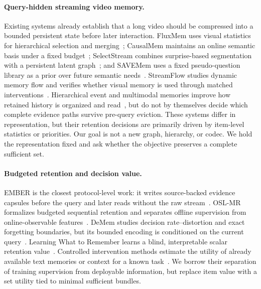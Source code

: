 \documentclass[10pt,twocolumn,letterpaper]{article}
\begin{document}
\paragraph{Query-hidden streaming video memory.}
Existing systems already establish that a long video should be compressed into a bounded persistent state before later interaction.
FluxMem uses visual statistics for hierarchical selection and merging~\cite{xie2026fluxmemadaptivehierarchicalmemory}; CausalMem maintains an online semantic basis under a fixed budget~\cite{song2026dynamicfixedbudgetmemorybank}; SelectStream combines surprise-based segmentation with a persistent latent graph~\cite{ge2026streamingvideomodelremember}; and SAVEMem uses a fixed pseudo-question library as a prior over future semantic needs~\cite{wu2026semanticawareadaptivevisualmemory}.
StreamFlow studies dynamic memory flow and verifies whether visual memory is used through matched interventions~\cite{fu2026streamflowdynamicmemoryflows}.
Hierarchical event and multimodal memories improve how retained history is organized and read~\cite{liang2026oasisondemandhierarchicalevent,yeo2026worldmmdynamicmultimodalmemory}, but do not by themselves decide which complete evidence paths survive pre-query eviction.
These systems differ in representation, but their retention decisions are primarily driven by item-level statistics or priorities.
Our goal is not a new graph, hierarchy, or codec.
We hold the representation fixed and ask whether the objective preserves a complete sufficient set.

\paragraph{Budgeted retention and decision value.}
EMBER is the closest protocol-level work: it writes source-backed evidence capsules before the query and later reads without the raw stream~\cite{li2026emberefficientmemorybudgeted}.
OSL-MR formalizes budgeted sequential retention and separates offline supervision from online-observable features~\cite{kang2026learningrememberobservabilitysafememory}.
DeMem studies decision rate--distortion and exact forgetting boundaries, but its bounded encoding is conditioned on the current query~\cite{zou2026rememberdecisiondescriptionratedistortion}.
Learning What to Remember learns a blind, interpretable scalar retention value~\cite{chen2026learningremembercognitivelygrounded}.
Controlled intervention methods estimate the utility of already available text memories or context for a known task~\cite{srivastava2026causalinterventionbasedmemoryselection,guan2026decisionawarememorycardscounterfactualinspired}.
We borrow their separation of training supervision from deployable information, but replace item value with a set utility tied to minimal sufficient bundles.
\end{document}
